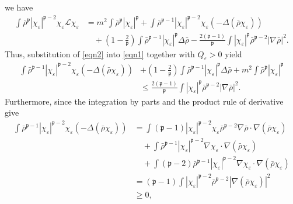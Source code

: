 \documentclass{article}
\begin{document}
%
we have
%
\begin{align}\label{eqn2}
    \int \bar{\rho}^{\mathfrak{p}} | \chi_{\varepsilon} |^{\mathfrak{p}- 2}
    \chi_{\varepsilon} \mathcal{L} \chi_{\varepsilon} & =  m^2 \int
    \bar{\rho}^{\mathfrak{p}} | \chi_{\varepsilon} |^{\mathfrak{p}} + \int
    \bar{\rho}^{\mathfrak{p}- 1} | \chi_{\varepsilon} |^{\mathfrak{p}- 2}
    \chi_{\varepsilon} (- \Delta (\bar{\rho} \chi_{\varepsilon})) \nonumber \\
    & \quad  + \left( 1 - \frac{2}{\mathfrak{p}} \right) \int
    \bar{\rho}^{\mathfrak{p}- 1} | \chi_{\varepsilon} |^{\mathfrak{p}}
    \Delta \bar{\rho} - \frac{2 (\mathfrak{p}- 1)}{\mathfrak{p}} \int |
    \chi_{\varepsilon} |^{\mathfrak{p}}  \bar{\rho}^{\mathfrak{p}- 2} |
    \nabla \bar{\rho} |^2 . 
\end{align}
%
Thus, substitution of \eqref{eqn2} into \eqref{eqn1} together with
$Q_{\varepsilon} > 0$ yield
%
\begin{align}\label{eqn3}
    \int \bar{\rho}^{\mathfrak{p}- 1} | \chi_{\varepsilon}
    |^{\mathfrak{p}- 2} \chi_{\varepsilon} (- \Delta (\bar{\rho}
    \chi_{\varepsilon})) & + \left( 1 - \frac{2}{\mathfrak{p}} \right) \int
    \bar{\rho}^{\mathfrak{p}- 1} | \chi_{\varepsilon} |^{\mathfrak{p}}
    \Delta \bar{\rho} + m^2 \int \bar{\rho}^{\mathfrak{p}} |
    \chi_{\varepsilon} |^{\mathfrak{p}} \nonumber\\
    & \leq \frac{2 (\mathfrak{p}- 1)}{\mathfrak{p}} \int |
    \chi_{\varepsilon} |^{\mathfrak{p}}  \bar{\rho}^{\mathfrak{p}- 2} |
    \nabla \bar{\rho} |^2.
\end{align}
%
Furthermore, since the integration by parts and the product rule of derivative
give
%
\begin{align}\label{eqn4}
    \int \bar{\rho}^{\mathfrak{p}- 1} | \chi_{\varepsilon} |^{\mathfrak{p}-
    2} \chi_{\varepsilon} (- \Delta (\bar{\rho} \chi_{\varepsilon})) & =
    \int (\mathfrak{p}- 1) | \chi_{\varepsilon} |^{\mathfrak{p}- 2}
    \chi_{\varepsilon} \bar{\rho}^{\mathfrak{p}- 2} \nabla \bar{\rho} \cdot
    \nabla (\bar{\rho} \chi_{\varepsilon}) \nonumber\\
    &  \quad + \int
    \bar{\rho}^{\mathfrak{p}-
    1} | \chi_{\varepsilon} |^{\mathfrak{p}- 2} \nabla
    \chi_{\varepsilon} \cdot \nabla (\bar{\rho} \chi_{\varepsilon}) \nonumber\\
    &  \quad + \int (\mathfrak{p}- 2)
    \bar{\rho}^{\mathfrak{p}- 1} | \chi_{\varepsilon} |^{\mathfrak{p}- 2}
    \nabla \chi_{\varepsilon} \cdot \nabla (\bar{\rho}
    \chi_{\varepsilon}) \nonumber\\
    & =  (\mathfrak{p}- 1) \int | \chi_{\varepsilon} |^{\mathfrak{p}- 2}
    \bar{\rho}^{\mathfrak{p}- 2} | \nabla (\bar{\rho} \chi_{\varepsilon})
    |^2 \nonumber \\
    & \geqslant  0,
\end{align}
\end{document}
